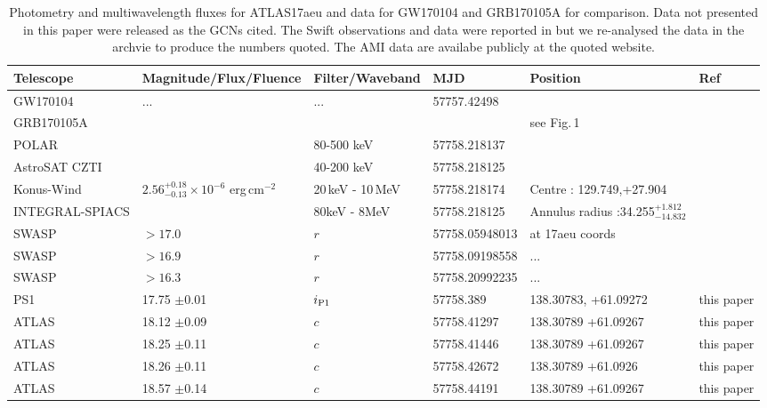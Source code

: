 \documentclass[twocolumn]{aastex61}
\newcommand{\ips}{\ensuremath{i_{\rm P1}}}
\begin{document}
\begin{table*}[]
\centering
\caption{Photometry and multiwavelength fluxes 
for ATLAS17aeu and data for GW170104 and GRB170105A for comparison.  Data not presented in this paper were
released as the GCNs cited. The Swift observations and data were reported in \cite{GCN20415,GCN20390} but we re-analysed the data in the archvie to produce the numbers quoted. The AMI data are availabe publicly at the quoted website.}
\label{tab:data}
\begin{scriptsize}
\begin{tabular}{llllll}\hline 
Telescope & Magnitude/Flux/Fluence      & Filter/Waveband &  MJD  & Position    & Ref    \\     \hline 
GW170104   & ... & ... & 57757.42498 & &  \cite{gw170104} \\ \hline 
GRB170105A   & &     &    & see Fig.\,1 &  \\            
POLAR      &                           &   80-500 keV   &  57758.218137         &     &    \cite{GCN20387}\\
AstroSAT CZTI      &                           &   40-200 keV   &  57758.218125        &     &    \cite{2017arXiv170600024B}\\
Konus-Wind         & $2.56_{-0.13}^{+0.18}\times 10^{-6}$ erg\,cm$^{-2}$ & 20\,keV - 10\,MeV & 57758.218174  & Centre : 129.749,+27.904  &  \cite{GCN20406} \\
INTEGRAL-SPIACS    &                             &  80keV - 8MeV  &    57758.218125  &  Annulus radius :34.255$_{-14.832}^{+1.812}$ & \cite{GCN20387}     \\ 
\hline 
SWASP &     $>17.0$      & $r$ &57758.05948013 &  at 17aeu coords  & \cite{GCN20434}\\
SWASP &         $>16.9$  & $r$ &57758.09198558 &  ... & \cite{GCN20434}\\
SWASP  &         $>16.3$  &$r$ &57758.20992235 &  ...  & \cite{GCN20434} \\
PS1       & 17.75 $\pm$0.01   & \ips &    57758.389 & 138.30783, +61.09272 & this paper \\
ATLAS     & 18.12   $\pm$0.09            & $c$      & 57758.41297 & 138.30789 +61.09267  & this paper \\
ATLAS     & 18.25   $\pm$0.11            & $c$   & 57758.41446  & 138.30789 +61.09267 & this paper\\
ATLAS     & 18.26   $\pm$0.11             & $c$      & 57758.42672  & 138.30789 +61.0926  & this paper \\
ATLAS     & 18.57   $\pm$0.14            & $c$      & 57758.44191  & 138.30789 +61.09267  & this paper \\

\end{tabular}
\end{scriptsize}
\end{table*}
\end{document}
